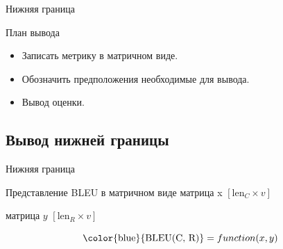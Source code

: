 \documentclass{beamer}					%
\begin{document}
    \begin{frame}{Нижняя граница}
        \begin{block}{План вывода}
        \begin{itemize}
            \item Записать метрику {\color{blue}{BLEU}} в матричном виде.
            \item Обозначить предположения необходимые для вывода.
            \item Вывод оценки.
        \end{itemize}
        \end{block}
    \end{frame}

    \subsection{Вывод нижней границы}




    \begin{frame}{Нижняя граница}
        \begin{block}{Представление BLEU в матричном виде}
            матрица x $[\textrm{len}_C \times v]$
            
            матрица $y$ $[\textrm{len}_R \times v]$
            

            \begin{equation}
                \textnormal{{\color{blue}{BLEU(C, R)}}} = function(x, y)
            \end{equation}   
        \end{block}       
          
    \end{frame}
\end{document}
